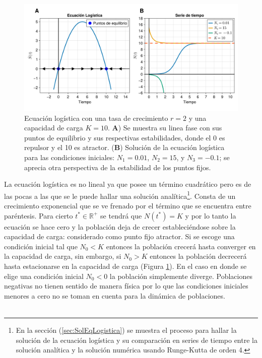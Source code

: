 \begin{figure}[h!]
	\centering
	\includegraphics[scale=0.23]{../../Imagenes/Ecuacion Logistica}
	\caption{Ecuación logística con una tasa de crecimiento $r=2$ y una capacidad de carga $K=10$. \textbf{A}) Se muestra su linea fase con sus puntos de equilibrio y sus respectivas estabilidades, donde el 0 es repulsor y el 10 es atractor. (\textbf{B}) Solución de la ecuación logística para las condiciones iniciales: $N_1=0.01$, $N_2=15$, y $N_3=-0.1$; se aprecia otra perspectiva de la estabilidad de los puntos fijos.}
	\label{fig:EcuacionLogistica}
\end{figure}		
La ecuación logística es no lineal ya que posee un término cuadrático pero es de las pocas a las que se le puede hallar una solución analítica\footnote{En la sección (\ref{sec:SolEqLogistica}) se muestra el proceso para hallar la solución de la ecuación logística y su comparación en series de tiempo entre la solución analítica y la solución numérica usando Runge-Kutta de orden 4.}. Consta de un crecimiento exponencial que se ve frenado por el término que se encuentra entre paréntesis. Para cierto $t^*\in\mathbb{R}^+$ se tendrá que $N(t^*)=K$ y por lo tanto la ecuación se hace cero y la población deja de crecer estableciéndose sobre la capacidad de carga: considerado como punto fijo atractor. Si se escoge una condición inicial tal que $N_0<K$ entonces la población crecerá hasta converger en la capacidad de carga,  sin embargo, si $N_0>K$ entonces la población decrecerá hasta estacionarse en la capacidad de carga (Figura \ref{fig:EcuacionLogistica}). En el caso en donde se elige una condición inicial $N_0<0$ la población simplemente diverge. Poblaciones negativas no tienen sentido de manera física por lo que las condiciones iniciales menores a cero no se toman en cuenta para la dinámica de poblaciones. \\
\\
